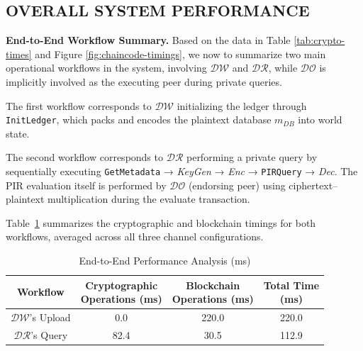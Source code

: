 \documentclass{ieeetj}
\begin{document}
\subsection{OVERALL SYSTEM PERFORMANCE}
  
\noindent\textbf{End-to-End Workflow Summary.}
Based on the data in Table \ref{tab:crypto-times} and Figure \ref{fig:chaincode-timings},
we now to summarize two main operational workflows in the system, involving $\mathcal{DW}$ and $\mathcal{DR}$, 
while $\mathcal{DO}$ is implicitly involved as the executing peer during private queries.

The first workflow corresponds to $\mathcal{DW}$ initializing the ledger through \texttt{InitLedger}, 
which packs and encodes the plaintext database \emph{$m_{DB}$} into world state. 

The second workflow corresponds to $\mathcal{DR}$ performing a private query by sequentially 
executing \texttt{GetMetadata} → \emph{KeyGen} → \emph{Enc} → \texttt{PIRQuery} → \emph{Dec}.
The PIR evaluation itself is performed by $\mathcal{DO}$ (endorsing peer) using ciphertext--plaintext 
multiplication during the evaluate transaction.

Table~\ref{tab:end2end} summarizes the cryptographic and blockchain timings for both workflows, 
averaged across all three channel configurations.

\begin{table}[!htbp]
    \caption{End-to-End Performance Analysis (ms)}
    \label{tab:end2end}
    \centering
    \begin{tabular}{|c|c|c|c|}
    \hline
    {Workflow} & 
    \shortstack{{Cryptographic} \\ {Operations (ms)}} & 
    \shortstack{{Blockchain} \\ {Operations (ms)}} & 
    \shortstack{{Total Time} \\ {(ms)}} \\
    \hline
    $\mathcal{DW}$'s Upload  & 0.0 & 220.0 & 220.0 \\
    $\mathcal{DR}$'s Query  & 82.4 & 30.5 & 112.9 \\
    \hline
    \end{tabular}
\end{table}
\end{document}
